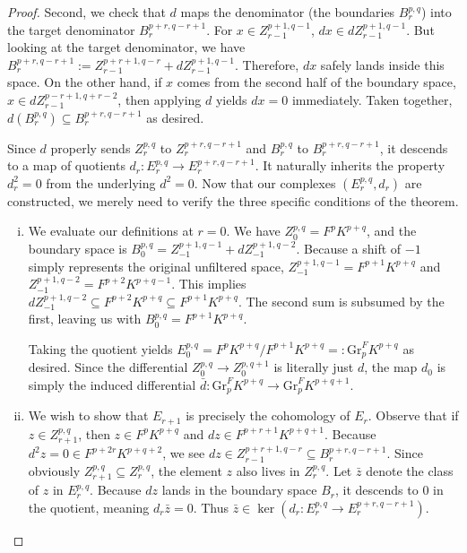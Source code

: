 \begin{proof}
    \medskip
    
    \noindent Second, we check that $d$ maps the denominator (the boundaries $B_r^{p,q}$) into the target denominator $B_r^{p+r,q-r+1}$. For $x\in Z_{r-1}^{p+1,q-1}$, $dx\in dZ_{r-1}^{p+1,q-1}$. But looking at the target denominator, we have $B_r^{p+r,q-r+1}:= Z_{r-1}^{p+r+1, q-r} + dZ_{r-1}^{p+1,q-1}$. Therefore, $dx$ safely lands inside this space. On the other hand, if $x$ comes from the second half of the boundary space, $x\in dZ_{r-1}^{p-r+1,q+r-2}$, then applying $d$ yields $dx=0$ immediately. Taken together, $d\left(B_r^{p,q}\right) \subseteq B_r^{p+r,q-r+1}$ as desired. 

    \medskip

    \noindent Since $d$ properly sends $Z_r^{p,q}$ to $Z_r^{p+r,q-r+1}$ and $B_r^{p,q}$ to $B_r^{p+r,q-r+1}$, it descends to a map of quotients $d_r:E_r^{p,q}\to E_r^{p+r,q-r+1}$. It naturally inherits the property $d_r^2=0$ from the underlying $d^2=0$. Now that our complexes $\left(E_r^{p,q},d_r\right)$ are constructed, we merely need to verify the three specific conditions of the theorem.

    \begin{enumerate}[i.]
        \item We evaluate our definitions at $r=0$. We have $Z_0^{p,q} = F^pK^{p+q}$, and the boundary space is $B_0^{p,q} = Z^{p+1,q-1}_{-1} + dZ^{p+1,q-2}_{-1}$. Because a shift of $-1$ simply represents the original unfiltered space, $Z^{p+1,q-1}_{-1} = F^{p+1}K^{p+q}$ and $Z^{p+1,q-2}_{-1} = F^{p+2}K^{p+q-1}$. This implies $dZ^{p+1,q-2}_{-1}\subseteq F^{p+2}K^{p+q} \subseteq F^{p+1}K^{p+q}$. The second sum is subsumed by the first, leaving us with $B_0^{p,q} =  F^{p+1}K^{p+q}$. 
        
        Taking the quotient yields $E_0^{p,q} = F^pK^{p+q}/F^{p+1}K^{p+q}=: \mathrm{Gr}_p^F K^{p+q}$ as desired. Since the differential $Z_0^{p,q}\to Z_0^{p,q+1}$ is literally just $d$, the map $d_0$ is simply the induced differential $\bar{d}:\mathrm{Gr}_p^FK^{p+q}\to \mathrm{Gr}_p^F K^{p+q+1}$.  

        \item We wish to show that $E_{r+1}$ is precisely the cohomology of $E_r$. Observe that if $z\in Z_{r+1}^{p,q}$, then $z\in F^p K^{p+q}$ and $dz\in F^{p+r+1}K^{p+q+1}$. Because $d^2z = 0\in F^{p+2r}K^{p+q+2}$, we see $dz\in Z_{r-1}^{p+r+1,q-r} \subseteq B_r^{p+r,q-r+1}$. Since obviously $Z_{r+1}^{p,q}\subseteq Z_r^{p,q}$, the element $z$ also lives in $Z_r^{p,q}$. Let $\bar z$ denote the class of $z$ in $E_r^{p,q}$. Because $dz$ lands in the boundary space $B_r$, it descends to $0$ in the quotient, meaning $d_r\bar z = 0$. Thus $\bar z\in \ker \left(d_r:E_r^{p,q} \to E_r^{p+r,q-r+1}\right)$. 


\end{enumerate}
\end{proof}
